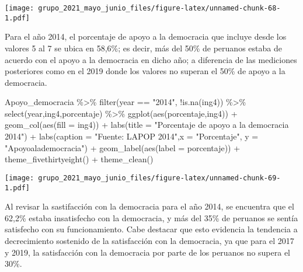 \documentclass[
]{book}
\newenvironment{Shaded}{\begin{snugshade}}{\end{snugshade}}
\newcommand{\AttributeTok}[1]{\textcolor[rgb]{0.77,0.63,0.00}{#1}}
\newcommand{\FunctionTok}[1]{\textcolor[rgb]{0.00,0.00,0.00}{#1}}
\newcommand{\NormalTok}[1]{#1}
\newcommand{\SpecialCharTok}[1]{\textcolor[rgb]{0.00,0.00,0.00}{#1}}
\newcommand{\StringTok}[1]{\textcolor[rgb]{0.31,0.60,0.02}{#1}}
\begin{document}
\texttt{[image: grupo\_2021\_mayo\_junio\_files/figure-latex/unnamed-chunk-68-1.pdf]}

Para el año 2014, el porcentaje de apoyo a la democracia que incluye desde los valores 5 al 7 se ubica en 58,6\%; es decir, más del 50\% de peruanos estaba de acuerdo con el apoyo a la democracia en dicho año; a diferencia de las mediciones posteriores como en el 2019 donde los valores no superan el 50\% de apoyo a la democracia.

\begin{Shaded}
\begin{Highlighting}[]
\NormalTok{Apoyo\_democracia }\SpecialCharTok{\%\textgreater{}\%}
  \FunctionTok{filter}\NormalTok{(year }\SpecialCharTok{==} \StringTok{"2014"}\NormalTok{, }\SpecialCharTok{!}\FunctionTok{is.na}\NormalTok{(ing4)) }\SpecialCharTok{\%\textgreater{}\%}
  \FunctionTok{select}\NormalTok{(year,ing4,porcentaje) }\SpecialCharTok{\%\textgreater{}\%}
  \FunctionTok{ggplot}\NormalTok{(}\FunctionTok{aes}\NormalTok{(porcentaje,ing4)) }\SpecialCharTok{+} 
  \FunctionTok{geom\_col}\NormalTok{(}\FunctionTok{aes}\NormalTok{(}\AttributeTok{fill =}\NormalTok{ ing4)) }\SpecialCharTok{+}
  \FunctionTok{labs}\NormalTok{(}\AttributeTok{title =} \StringTok{"Porcentaje de apoyo a la democracia 2014"}\NormalTok{) }\SpecialCharTok{+}
  \FunctionTok{labs}\NormalTok{(}\AttributeTok{caption =} \StringTok{"Fuente: LAPOP 2014"}\NormalTok{,}\AttributeTok{x =} \StringTok{"Porcentaje"}\NormalTok{, }\AttributeTok{y =} \StringTok{"Apoyoalademocracia"}\NormalTok{) }\SpecialCharTok{+}
  \FunctionTok{geom\_label}\NormalTok{(}\FunctionTok{aes}\NormalTok{(}\AttributeTok{label =}\NormalTok{ porcentaje)) }\SpecialCharTok{+}
  \FunctionTok{theme\_fivethirtyeight}\NormalTok{() }\SpecialCharTok{+}
  \FunctionTok{theme\_clean}\NormalTok{()}
\end{Highlighting}
\end{Shaded}

\texttt{[image: grupo\_2021\_mayo\_junio\_files/figure-latex/unnamed-chunk-69-1.pdf]}

Al revisar la sastifacción con la democracia para el año 2014, se encuentra que el 62,2\% estaba insatisfecho con la democracia, y más del 35\% de peruanos se sentía satisfecho con su funcionamiento. Cabe destacar que esto evidencia la tendencia a decrecimiento sostenido de la satisfacción con la democracia, ya que para el 2017 y 2019, la satisfacción con la democracia por parte de los peruanos no supera el 30\%.
\end{document}
